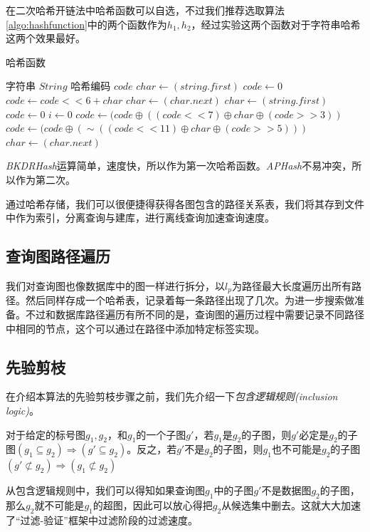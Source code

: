 \documentclass{XDBAthesis}
\numberwithin{algorithm}{chapter}
\begin{document}
在二次哈希开链法中哈希函数可以自选，不过我们推荐选取算法\ref{algo:hashfunction}中的两个函数作为$h_1 ,h_2 $，经过实验这两个函数对于字符串哈希这两个效果最好。

\begin{algorithm}
\caption{哈希函数}
\label{algo:hashfunction}
\begin{algorithmic}[1]
    \Require 字符串 $String$
    \Ensure 哈希编码 $code$
        \State $char \gets (string.first)$
        \State $code \gets 0$
            \State $code \gets code<<6+char$
            \State $char \gets (char.next)$
        \EndWhile
        \State {}
    \EndFunction
        \State $char \gets (string.first)$
        \State $code \gets 0$
        \State $i \gets 0 $
                \State $code \gets (code\oplus ((code<<7)\oplus char\oplus (code>>3))$
            \Else
                \State $code \gets (code\oplus (\sim ((code<<11)\oplus char\oplus (code>>5)))  $
            \EndIf
            \State $char \gets (char.next)$
        \EndWhile
        \State {}
    \EndFunction          
\end{algorithmic}
\end{algorithm}

\emph{BKDRHash}运算简单，速度快，所以作为第一次哈希函数。\emph{APHash}不易冲突，所以作为第二次。

通过哈希存储，我们可以很便捷得获得各图包含的路径关系表，我们将其存到文件中作为索引，分离查询与建库，进行离线查询加速查询速度。

\subsection{查询图路径遍历}
我们对查询图也像数据库中的图一样进行拆分，以$l_p $为路径最大长度遍历出所有路径。然后同样存成一个哈希表，记录着每一条路径出现了几次。为进一步搜索做准备。不过和数据库路径遍历有所不同的是，查询图的遍历过程中需要记录不同路径中相同的节点，这个可以通过在路径中添加特定标签实现。
\subsection{先验剪枝}
    在介绍本算法的先验剪枝步骤之前，我们先介绍一下\emph{包含逻辑规则(inclusion logic)}。
    \begin{defn}[包含逻辑]\cite{inclusionlogic}
        对于给定的标号图$g_1 ,g_2 $，和$g_1 $的一个子图$g'$，若$g_1 $是$g_2 $的子图，则$g'$必定是$g_2 $的子图$(g_1 \subseteq g_2 ) \Rightarrow (g' \subseteq g_2  )$。反之，若$g'$不是$g_2 $的子图，则$g_1 $也不可能是$g_2 $的子图$(g' \not\subset g_2  )\Rightarrow (g_1 \not\subset g_2 )$    
    \end{defn}
    从包含逻辑规则中，我们可以得知如果查询图$g_1 $中的子图$g'$不是数据图$g_2 $的子图，那么$g_2 $就不可能是$g_1 $的超图，因此可以放心得把$g_2 $从候选集中删去。这就大大加速了“过滤-验证”框架中过滤阶段的过滤速度。
    
\end{document}
